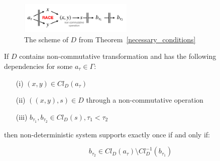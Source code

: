 \begin{figure}[htbp]
  \centering
  \includegraphics[width=0.48\textwidth]{pics/theorem-pic}
  \caption{The scheme of $D$ from Theorem~\ref{necessary_conditions}}
  \label {theorem-pic}
\end{figure}

\begin{theorem}
\label{necessary_conditions}
If $D$ contains non-commutative transformation and has the following dependencies for some $a_\tau \in \Gamma$:

\begin{enumerate}
    \item[(i)] $(x,y)\in Cl_D(a_\tau)$
    \item[(ii)] $((x,y),s)\in D$ through a non-commutative operation
    \item[(iii)] $b_{\tau_1}, b_{\tau_2} \in Cl_D(s), \tau_1 < \tau_2$
\end{enumerate}

\noindent then non-deterministic system supports exactly once if and only if:

\begin{equation}
\label{theorem_conditions}
b_{\tau_2} \in Cl_D(a_\tau) \setminus Cl^{-1}_D(b_{\tau_1})   
\end{equation}

\end{theorem}
